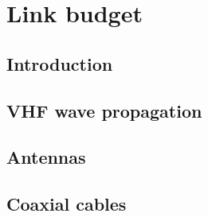\chapter{Link budget}

\section{Introduction}
\section{VHF wave propagation}
\section{Antennas}
\section{Coaxial cables}